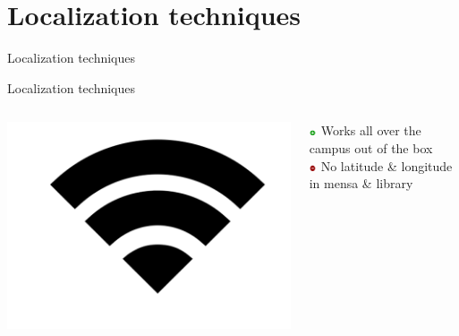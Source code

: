 \documentclass[11pt]{beamer}
\begin{document}
\section{Localization techniques}

\begin{frame}{}

  \begin{center}

    {\Huge Localization techniques}

  \end{center}

\end{frame}


\begin{frame}{Localization techniques}

  \begin{columns}

    \begin{column}{0.2\textwidth}
      \includegraphics[width=\textwidth]{wifi-symbol}
    \end{column}

    \hfill

    \begin{column}{0.8\textwidth}

      \includegraphics[width=0.05\textwidth]{plus} Works all over the campus out of the box\\
      \includegraphics[width=0.05\textwidth]{minus} No latitude \& longitude in mensa \& library


\end{column}
\end{columns}
\end{frame}
\end{document}
